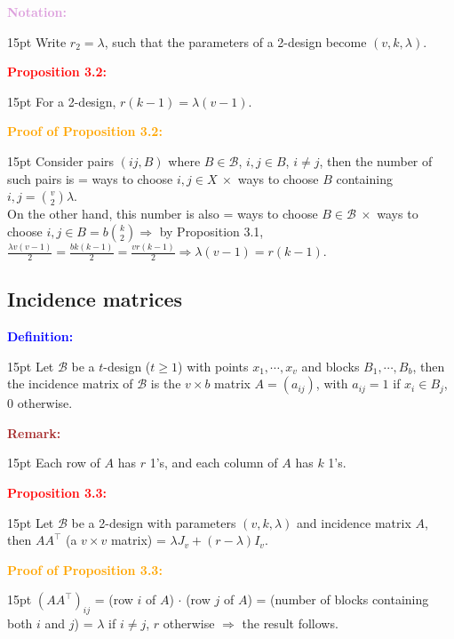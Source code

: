 \documentclass[12pt]{article}
\newcommand{\noparskip}{\vspace{-\parskip}}
\newenvironment{dent}
	{\begin{adjustwidth}{15pt}{}\noparskip}
	{\end{adjustwidth}}
\newenvironment{result}[1]
	{\textcolor{Red}{\textbf{#1:}}\begin{dent}}
	{\end{dent}}
\newenvironment{proof}[1]
	{\textcolor{Orange}{\textbf{Proof of #1:}}\begin{dent}}
	{\end{dent}}
\newenvironment{definition}
	{\textcolor{Blue}{\textbf{Definition:}}\begin{dent}}
	{\end{dent}}
\newenvironment{notation}
	{\textcolor{Plum}{\textbf{Notation:}}\begin{dent}}
	{\end{dent}}
\newenvironment{remark}
	{\textcolor{Brown}{\textbf{Remark:}}\begin{dent}}
	{\end{dent}}
\renewcommand{\implies}{\Rightarrow}
\newcommand{\cB}{\mathcal{B}}
\begin{document}
\begin{notation}
Write $r_2 = \lambda$, such that the parameters of a 2-design become $(v, k, \lambda)$.
\end{notation}

\begin{result}{Proposition 3.2}
For a 2-design, $r(k - 1) = \lambda (v - 1)$.
\end{result}

\begin{proof}{Proposition 3.2}
Consider pairs $(ij, B)$ where $B \in \cB$, $i, j \in B$, $i \ne j$, then the number of such pairs is = ways to choose $i, j \in X\ \times$ ways to choose $B$ containing $i, j = \binom{v}{2} \lambda$. \\
On the other hand, this number is also = ways to choose $B \in \cB\ \times$ ways to choose $i, j \in B = b \binom{k}{2} \implies$ by Proposition 3.1, $\frac{\lambda v(v - 1)}{2} = \frac{bk(k - 1)}{2} = \frac{vr(k - 1)}{2} \implies \lambda (v - 1) = r(k - 1)$.
\end{proof}

\subsection{Incidence matrices}

\begin{definition}
Let $\cB$ be a $t$-design ($t \ge 1$) with points $x_1, \cdots, x_v$ and blocks $B_1, \cdots, B_b$, then the incidence matrix of $\cB$ is the $v \times b$ matrix $A = (a_{ij})$, with $a_{ij} = 1$ if $x_i \in B_j$, 0 otherwise.
\end{definition}

\begin{remark}
Each row of $A$ has $r$ 1's, and each column of $A$ has $k$ 1's.
\end{remark}

\begin{result}{Proposition 3.3}
Let $\cB$ be a 2-design with parameters $(v, k, \lambda)$ and incidence matrix $A$, then $AA^\top$ (a $v \times v$ matrix) = $\lambda J_v + (r - \lambda) I_v$.
\end{result}

\begin{proof}{Proposition 3.3}
$(AA^\top)_{ij}$ = (row $i$ of $A$) $\cdot$ (row $j$ of $A$) = (number of blocks containing both $i$ and $j$) = $\lambda$ if $i \ne j$, $r$ otherwise $\implies$ the result follows.
\end{proof}
\end{document}
